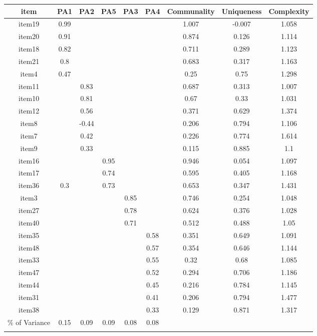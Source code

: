 \documentclass[
  english,
  man]{apa6}
\begin{document}
\begin{appendix}
\begin{table}[h]
\begin{center}
\begin{threeparttable}
{\begin{tabular}{ccccccccc}
\toprule
item & \multicolumn{1}{c}{PA1} & \multicolumn{1}{c}{PA2} & \multicolumn{1}{c}{PA5} & \multicolumn{1}{c}{PA3} & \multicolumn{1}{c}{PA4} & \multicolumn{1}{c}{Communality} & \multicolumn{1}{c}{Uniqueness} & \multicolumn{1}{c}{Complexity}\\
\midrule
item19 & 0.99 &  &  &  &  & 1.007 & -0.007 & 1.058\\
item20 & 0.91 &  &  &  &  & 0.874 & 0.126 & 1.114\\
item18 & 0.82 &  &  &  &  & 0.711 & 0.289 & 1.123\\
item21 & 0.8 &  &  &  &  & 0.683 & 0.317 & 1.163\\
item4 & 0.47 &  &  &  &  & 0.25 & 0.75 & 1.298\\
item11 &  & 0.83 &  &  &  & 0.687 & 0.313 & 1.007\\
item10 &  & 0.81 &  &  &  & 0.67 & 0.33 & 1.031\\
item12 &  & 0.56 &  &  &  & 0.371 & 0.629 & 1.374\\
item8 &  & -0.44 &  &  &  & 0.206 & 0.794 & 1.106\\
item7 &  & 0.42 &  &  &  & 0.226 & 0.774 & 1.614\\
item9 &  & 0.33 &  &  &  & 0.115 & 0.885 & 1.1\\
item16 &  &  & 0.95 &  &  & 0.946 & 0.054 & 1.097\\
item17 &  &  & 0.74 &  &  & 0.595 & 0.405 & 1.168\\
item36 & 0.3 &  & 0.73 &  &  & 0.653 & 0.347 & 1.431\\
item3 &  &  &  & 0.85 &  & 0.746 & 0.254 & 1.048\\
item27 &  &  &  & 0.78 &  & 0.624 & 0.376 & 1.028\\
item40 &  &  &  & 0.71 &  & 0.512 & 0.488 & 1.05\\
item35 &  &  &  &  & 0.58 & 0.351 & 0.649 & 1.091\\
item48 &  &  &  &  & 0.57 & 0.354 & 0.646 & 1.144\\
item33 &  &  &  &  & 0.55 & 0.32 & 0.68 & 1.085\\
item47 &  &  &  &  & 0.52 & 0.294 & 0.706 & 1.186\\
item44 &  &  &  &  & 0.45 & 0.216 & 0.784 & 1.145\\
item31 &  &  &  &  & 0.41 & 0.206 & 0.794 & 1.477\\
item38 &  &  &  &  & 0.33 & 0.129 & 0.871 & 1.317\\
\% of Variance & 0.15 & 0.09 & 0.09 & 0.08 & 0.08 &  &  & \\
\bottomrule
\addlinespace
\end{tabular}

}
\end{threeparttable}
\end{center}
\end{table}
\end{appendix}
\end{document}
